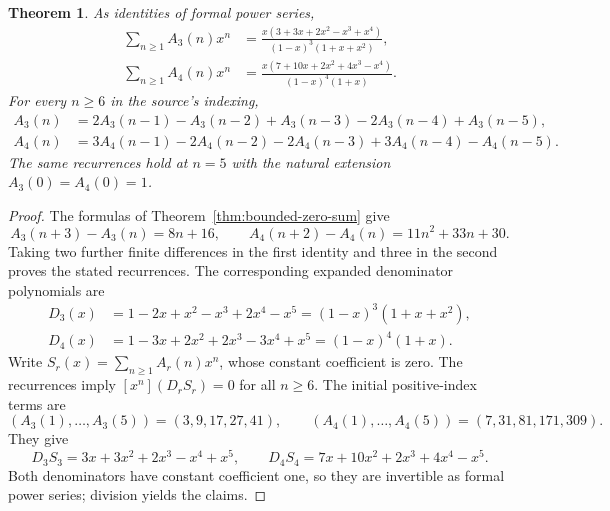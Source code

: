 \documentclass[11pt]{article}
\newtheorem{theorem}{Theorem}[section]
\begin{document}
\begin{theorem}\label{thm:bounded-zero-sum-gf}
As identities of formal power series,
\begin{align*}
 \sum_{n\ge1}A_3(n)x^n
   &=\frac{x(3+3x+2x^2-x^3+x^4)}{(1-x)^3(1+x+x^2)},\\
 \sum_{n\ge1}A_4(n)x^n
   &=\frac{x(7+10x+2x^2+4x^3-x^4)}{(1-x)^4(1+x)}.
\end{align*}
For every $n\ge6$ in the source's indexing,
\begin{align*}
 A_3(n)&=2A_3(n-1)-A_3(n-2)+A_3(n-3)
                    -2A_3(n-4)+A_3(n-5),\\
 A_4(n)&=3A_4(n-1)-2A_4(n-2)-2A_4(n-3)
                    +3A_4(n-4)-A_4(n-5).
\end{align*}
The same recurrences hold at $n=5$ with the natural extension
$A_3(0)=A_4(0)=1$.
\end{theorem}

\begin{proof}
The formulas of Theorem~\ref{thm:bounded-zero-sum} give
\[
 A_3(n+3)-A_3(n)=8n+16,\qquad
 A_4(n+2)-A_4(n)=11n^2+33n+30.
\]
Taking two further finite differences in the first identity and three
in the second proves the stated recurrences. The corresponding
expanded denominator polynomials are
\begin{align*}
 D_3(x)&=1-2x+x^2-x^3+2x^4-x^5
          =(1-x)^3(1+x+x^2),\\
 D_4(x)&=1-3x+2x^2+2x^3-3x^4+x^5
          =(1-x)^4(1+x).
\end{align*}
Write $S_r(x)=\sum_{n\ge1}A_r(n)x^n$, whose constant coefficient is
zero. The recurrences imply $[x^n](D_rS_r)=0$ for all $n\ge6$.
The initial positive-index terms are
\[
 (A_3(1),\ldots,A_3(5))=(3,9,17,27,41),\qquad
 (A_4(1),\ldots,A_4(5))=(7,31,81,171,309).
\]
They give
\[
 D_3S_3=3x+3x^2+2x^3-x^4+x^5,\qquad
 D_4S_4=7x+10x^2+2x^3+4x^4-x^5.
\]
Both denominators have constant coefficient one, so they are
invertible as formal power series; division yields the claims.
\end{proof}
\end{document}
